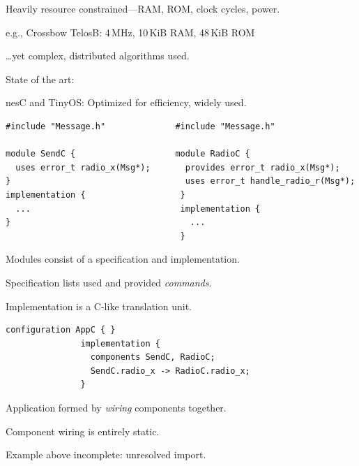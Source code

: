 
\begin{citemize}
\item Heavily resource constrained---RAM, ROM, clock cycles, power.
\item e.g., Crossbow TelosB: 4\,MHz, 10\,KiB RAM, 48\,KiB ROM
\item \ldots yet complex, distributed algorithms used.
\end{citemize}

State of the art:
\begin{citemize}
\item nesC and TinyOS: Optimized for efficiency, widely used.
\end{citemize}
\stopslide


{\small
\begin{lstlisting}[language=nesC, escapechar=!]
#include "Message.h"              #include "Message.h"

module SendC {                    module RadioC {
  uses error_t radio_x(Msg*);       provides error_t radio_x(Msg*);
}                                   uses error_t handle_radio_r(Msg*);
implementation {                   }
  ...                              implementation {
}                                    ...
                                   }
\end{lstlisting} 
}
\begin{citemize}
\item Modules consist of a specification and implementation.
\item Specification lists used and provided \emph{commands}.
\item Implementation is a C-like translation unit.
\end{citemize}
\stopslide



{\small
\begin{lstlisting}[language=nesC]
               configuration AppC { }
               implementation {
                 components SendC, RadioC;
                 SendC.radio_x -> RadioC.radio_x;
               }
\end{lstlisting}
}

\begin{citemize}
  \item Application formed by \emph{wiring} components together.
  \item Component wiring is entirely static.
  \item Example above incomplete: unresolved import.
\end{citemize}
\stopslide

